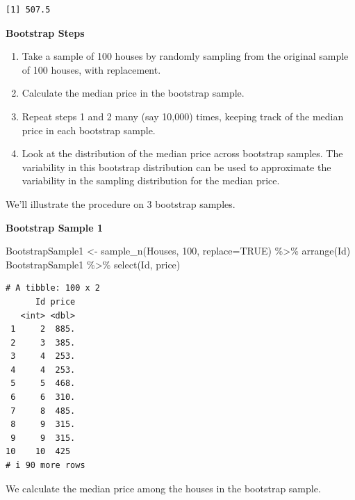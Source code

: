\documentclass[
  letterpaper,
  DIV=11,
  numbers=noendperiod]{scrreprt}
\newenvironment{Shaded}{\begin{snugshade}}{\end{snugshade}}
\newcommand{\AttributeTok}[1]{\textcolor[rgb]{0.40,0.45,0.13}{#1}}
\newcommand{\ConstantTok}[1]{\textcolor[rgb]{0.56,0.35,0.01}{#1}}
\newcommand{\DecValTok}[1]{\textcolor[rgb]{0.68,0.00,0.00}{#1}}
\newcommand{\FunctionTok}[1]{\textcolor[rgb]{0.28,0.35,0.67}{#1}}
\newcommand{\NormalTok}[1]{\textcolor[rgb]{0.00,0.23,0.31}{#1}}
\newcommand{\OtherTok}[1]{\textcolor[rgb]{0.00,0.23,0.31}{#1}}
\newcommand{\SpecialCharTok}[1]{\textcolor[rgb]{0.37,0.37,0.37}{#1}}
\begin{document}
\begin{verbatim}
[1] 507.5
\end{verbatim}

\textbf{Bootstrap Steps}

\begin{enumerate}
\def\labelenumi{\arabic{enumi}.}
\item
  Take a sample of 100 houses by randomly sampling from the original
  sample of 100 houses, with replacement.
\item
  Calculate the median price in the bootstrap sample.
\item
  Repeat steps 1 and 2 many (say 10,000) times, keeping track of the
  median price in each bootstrap sample.
\item
  Look at the distribution of the median price across bootstrap samples.
  The variability in this bootstrap distribution can be used to
  approximate the variability in the sampling distribution for the
  median price.
\end{enumerate}

We'll illustrate the procedure on 3 bootstrap samples.

\textbf{Bootstrap Sample 1}

\begin{Shaded}
\begin{Highlighting}[]
\NormalTok{BootstrapSample1 }\OtherTok{\textless{}{-}} \FunctionTok{sample\_n}\NormalTok{(Houses, }\DecValTok{100}\NormalTok{, }\AttributeTok{replace=}\ConstantTok{TRUE}\NormalTok{) }\SpecialCharTok{\%\textgreater{}\%} \FunctionTok{arrange}\NormalTok{(Id)}
\NormalTok{BootstrapSample1 }\SpecialCharTok{\%\textgreater{}\%} \FunctionTok{select}\NormalTok{(Id, price)}
\end{Highlighting}
\end{Shaded}

\begin{verbatim}
# A tibble: 100 x 2
      Id price
   <int> <dbl>
 1     2  885.
 2     3  385.
 3     4  253.
 4     4  253.
 5     5  468.
 6     6  310.
 7     8  485.
 8     9  315.
 9     9  315.
10    10  425 
# i 90 more rows
\end{verbatim}

We calculate the median price among the houses in the bootstrap sample.

\begin{Shaded}
\end{Shaded}
\end{document}
